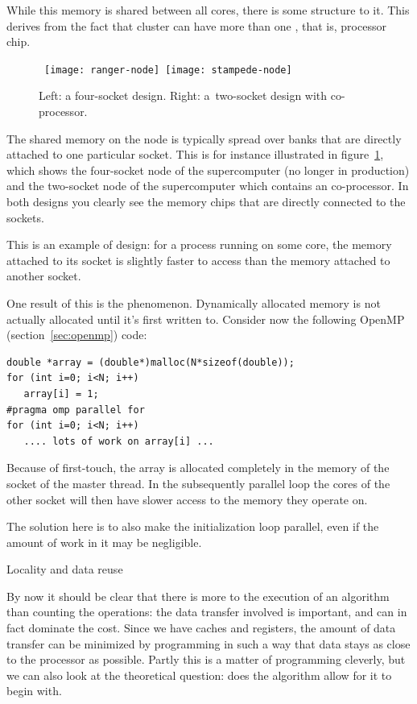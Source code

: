 While this memory is shared between all cores, there is some structure
to it. This derives from the fact that cluster  can
have more than one , that is, processor chip.
\begin{figure}[ht]
  \hbox{
    \texttt{[image: ranger-node]}
    \texttt{[image: stampede-node]}
    }
  \caption{Left: a four-socket design. Right: a~two-socket design with co-processor.}
  \label{fig:stampede-node}
\end{figure}
The shared memory on the node is typically spread over banks that are
directly attached to one particular socket.
This is for instance illustrated in figure~\ref{fig:stampede-node},
which shows the four-socket node of the 
supercomputer (no longer in production) and the two-socket node of the 
supercomputer which contains an 
co-processor.
In both designs you clearly see the memory chips that are directly
connected to the sockets.

This is an example of  design: for a process running on
some core, the memory attached to its socket is slightly faster to
access than the memory attached to another socket.

One result of this is the  phenomenon.
Dynamically allocated memory is not actually allocated until it's
first written to. Consider now the following OpenMP
(section~\ref{sec:openmp}) code:
\begin{verbatim}
double *array = (double*)malloc(N*sizeof(double));
for (int i=0; i<N; i++)
   array[i] = 1;
#pragma omp parallel for
for (int i=0; i<N; i++)
   .... lots of work on array[i] ...
\end{verbatim}
Because of first-touch, the array is allocated completely in the
memory of the socket of the master thread. In the subsequently parallel
loop the cores of the other socket will then have slower access to the
memory they operate on.

The solution here is to also make the initialization loop parallel,
even if the amount of work in it may be negligible.


 {Locality and data reuse}

By now it should be clear that there is more to the execution of an
algorithm than counting the operations: the data transfer involved is
important, and can in fact dominate the cost. Since we have caches and
registers, the amount of data transfer can be minimized by programming
in such a way that data stays as close to the processor as
possible. Partly this is a matter of programming cleverly, but we can
also look at the theoretical question: does the algorithm allow for it
to begin with.

